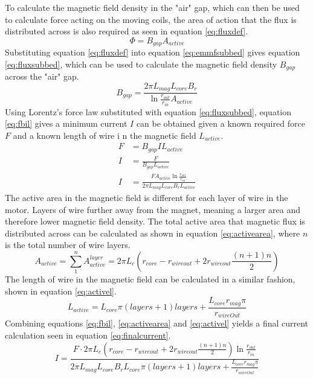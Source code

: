 \documentclass[a4paper,12pt]{article}
\begin{document}
To calculate the magnetic field density in the "air" gap, which can then be used to calculate force acting on the moving coils, the area of action that the flux is distributed across is also required as seen in equation \ref{eq:fluxdef}.
\begin{equation}\label{eq:fluxdef}
\Phi = B_{gap}A_{active}
\end{equation}
Substituting equation \ref{eq:fluxdef} into equation \ref{eq:emmfsubbed} gives equation \ref{eq:fluxsubbed}, which can be used to calculate the magnetic field density $B_{gap}$ across the "air" gap.
\begin{equation}\label{eq:fluxsubbed}
B_{gap} = \frac{2\pi L_{mag} L_{core} B_r}{\ln{\frac{r_{out}}{r_{in}}}A_{active}}
\end{equation}
Using Lorentz's force law substituted with equation \ref{eq:fluxsubbed}, equation \ref{eq:fbil} gives a minimum current $I$ can be obtained given a known required force $F$ and a known length of wire i
n the magnetic field $L_{active}$.
\begin{equation}\label{eq:fbil}
\begin{split}
F & = B_{gap}IL_{active}\\
I & = \frac{F}{B_{gap}L_{active}}\\
I & = \frac{F A_{active} \ln{\frac{r_{out}}{r_{in}}}}{2\pi L_{mag} L_{core} B_r L_{active}}
\end{split}
\end{equation}
The active area in the magnetic field is different for each layer of wire in the motor. Layers of wire further away from the magnet, meaning a larger area and therefore lower magnetic field density. The total active area that magnetic flux is distributed across can be calculated as shown in equation \ref{eq:activearea}, where $n$ is the total number of wire layers.
\begin{equation}\label{eq:activearea}
A_{active} = \sum_{1}^{n}{A_{active}^{layer}} = 2\pi L_c (r_{core}-r_{wireout} + 2r_{wireout} \frac{(n+1)n}{2})
\end{equation}
The length of wire in the magnetic field can be calculated in a similar fashion, shown in equation \ref{eq:activel}.
\begin{equation}\label{eq:activel}
L_{active} = L_{core}\pi(layers+1)layers + \frac{L_{core} r_{mag} \pi}{r_{wireOut}}
\end{equation}
Combining equations \ref{eq:fbil}, \ref{eq:activearea} and \ref{eq:activel} yields a final current calculation seen in equation \ref{eq:finalcurrent}.
\begin{equation}\label{eq:finalcurrent}
I = \frac{F\cdot 2\pi L_c (r_{core}-r_{wireout} + 2r_{wireout} \frac{(n+1)n}{2}) \ln{\frac{r_{out}}{r_{in}}}}{2\pi L_{mag} L_{core} B_r L_{core}\pi(layers+1)layers + \frac{L_{core} r_{mag} \pi}{r_{wireOut}}}
\end{equation}
\end{document}
